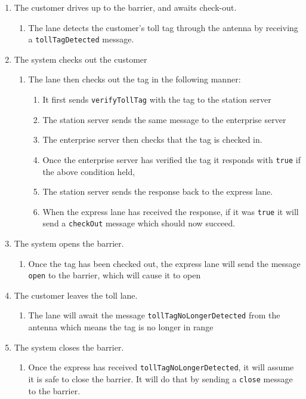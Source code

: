 \begin{enumerate}
\item The customer drives up to the barrier, and awaits check-out.

\begin{enumerate}
\item The lane detects the customer's toll tag through the antenna by receiving
a \texttt{tollTagDetected} message.
\end{enumerate}
\item The system checks out the customer

\begin{enumerate}
\item The lane then checks out the tag in the following manner:

\begin{enumerate}
\item It first sends \texttt{verifyTollTag} with the tag to the station server
\item The station server sends the same message to the enterprise server
\item The enterprise server then checks that the tag is checked in.
\item Once the enterprise server has verified the tag it responds with \texttt{true}
if the above condition held,
\item The station server sends the response back to the express lane.
\item When the express lane has received the response, if it was \texttt{true} it
will send a \texttt{checkOut} message which should now succeed.
\end{enumerate}
\end{enumerate}
\item The system opens the barrier.

\begin{enumerate}
\item Once the tag has been checked out, the express lane will send the
message \texttt{open} to the barrier, which will cause it to open
\end{enumerate}
\item The customer leaves the toll lane.

\begin{enumerate}
\item The lane will await the message \texttt{tollTagNoLongerDetected} from the antenna
which means the tag is no longer in range
\end{enumerate}
\item The system closes the barrier.

\begin{enumerate}
\item Once the express has received \texttt{tollTagNoLongerDetected}, it will assume
it is safe to close the barrier. It will do that by sending a \texttt{close}
message to the barrier.\end{enumerate}
\end{enumerate}

